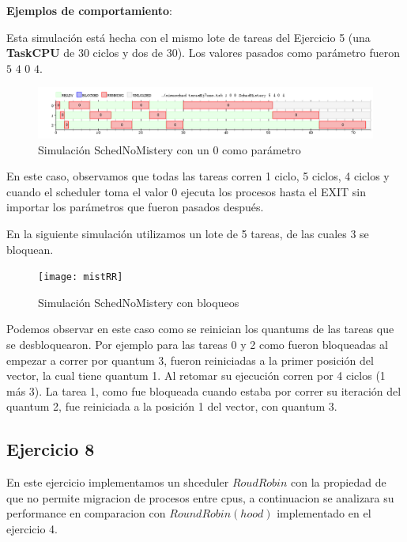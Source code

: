 \documentclass[11pt]{article}
\begin{document}
\vspace{1mm}
\textbf{Ejemplos de comportamiento}:
\vspace{1mm}

Esta simulación está hecha con el mismo lote de tareas del Ejercicio 5 (una \textbf{TaskCPU} de 30 ciclos y dos de 30). 
Los valores pasados como parámetro fueron $5$ $4$ $0$ $4$.


      \begin{figure}[H]
        \includegraphics[scale=0.5]{Ej7Ej1}
        \caption{Simulación SchedNoMistery con un 0 como parámetro} 
      \end{figure}

En este caso, observamos que todas las tareas corren 1 ciclo, 5 ciclos, 4 ciclos y cuando el scheduler toma el valor 0 ejecuta los procesos hasta el EXIT sin importar los parámetros que fueron pasados después.  

En la siguiente simulación utilizamos un lote de 5 tareas, de las cuales 3 se bloquean.


      \begin{figure}[H]
        \texttt{[image: mistRR]}
        \caption{Simulación SchedNoMistery con bloqueos} 
      \end{figure}

Podemos observar en este caso como se reinician los quantums de las tareas que se desbloquearon. Por ejemplo para las tareas 0 y 2 como fueron 
bloqueadas al empezar a correr por quantum 3, fueron reiniciadas a la primer posición del vector, la cual tiene quantum 1. Al retomar su ejecución 
corren por 4 ciclos (1 más 3). La tarea 1, como fue bloqueada cuando estaba por correr su iteración del quantum 2, fue reiniciada a la posición 
1 del vector, con quantum 3.

\newpage

\subsection{Ejercicio 8}
En este ejercicio implementamos un shceduler $Roud Robin$ con la propiedad de que no permite migracion de procesos entre cpus, a continuacion se analizara su performance en comparacion con $Round Robin(hood)$ implementado en el ejercicio 4. \\
\end{document}

